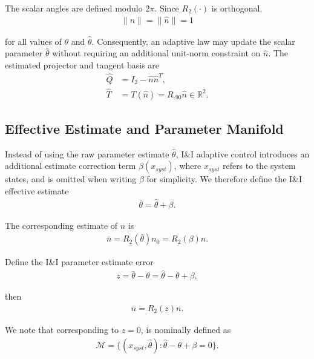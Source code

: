 \documentclass[10pt,journal,letterpaper]{IEEEtran}
\begin{document}
The scalar angles are defined modulo $2\pi$. Since $R_{2}(\cdot)$ is orthogonal,
\begin{align*}
\|n\|=\|\hat n\|=1
\end{align*}

for all values of $\theta$ and $\hat\theta$. Consequently, an adaptive law may update the scalar parameter $\hat\theta$ without requiring an additional unit-norm constraint on $\hat n$. The estimated projector and tangent basis are
\begin{align*}
\hat Q&=I_2-\hat n\hat n^{T}, \\
\hat T&=T(\hat n)=R_{\text{-90}}\hat n\in\mathbb R^2.
\end{align*}

\subsection{Effective Estimate and Parameter Manifold}
Instead of using the raw parameter estimate $\hat\theta$, I\&I adaptive control introduces an additional  estimate correction term $\beta(x_{syst})$, where $x_{syst}$ refers to the system states, and is omitted when writing $\beta$ for simplicity. We therefore define the I\&I effective estimate 
\begin{equation}\label{eq:effective-angle}
\begin{aligned}
\bar\theta=\hat\theta+\beta.
\end{aligned}
\end{equation}

The corresponding estimate of $n$ is
\begin{equation}\label{eq:effective-normal}
\begin{aligned}
\bar n=R_{2}(\bar\theta)n_0=R_{2}(\beta)\hat n.
\end{aligned}
\end{equation}

Define the I\&I parameter estimate error
\begin{equation}\label{eq:parameter-error}
\begin{aligned}
z
=
\bar\theta-\theta
=
\hat\theta-\theta+\beta,
\end{aligned}
\end{equation}

then 
\begin{align*}
\bar n=R_{2}(z)n.
\end{align*}

We note that corresponding to $z=0$, is nominally defined as 
\begin{equation}\label{eq:parameter-manifold}
\begin{aligned}
\mathcal M=\{(x_{syst},\hat\theta):\hat\theta-\theta+\beta=0\}.
\end{aligned}
\end{equation}
\end{document}
